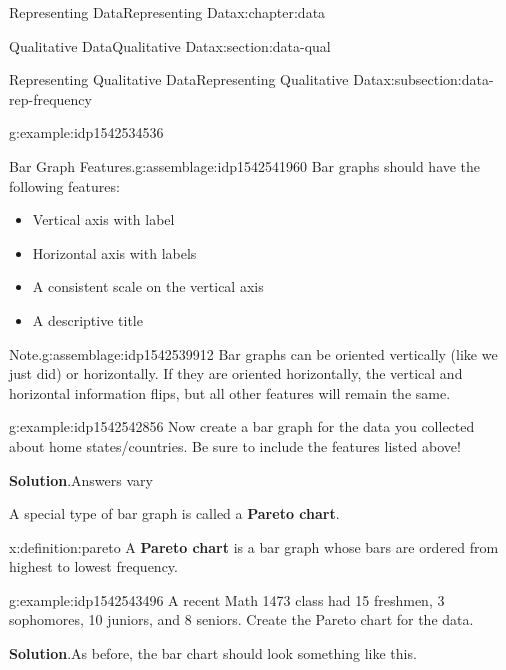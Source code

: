\documentclass[oneside,10pt,]{book}
\newcommand{\blocktitlefont}{\relax}
\newcommand{\terminology}[1]{\textbf{#1}}
\begin{document}
\begin{chapterptx}{Representing Data}{}{Representing Data}{}{}{x:chapter:data}
\begin{sectionptx}{Qualitative Data}{}{Qualitative Data}{}{}{x:section:data-qual}
\begin{subsectionptx}{Representing Qualitative Data}{}{Representing Qualitative Data}{}{}{x:subsection:data-rep-frequency}
\begin{example}{}{g:example:idp1542534536}
%
\end{example}
\begin{assemblage}{Bar Graph Features.}{g:assemblage:idp1542541960}%
Bar graphs should have the following features:%
\par
%
\begin{itemize}[label=\textbullet]
\item{}Vertical axis with label%
\item{}Horizontal axis with labels%
\item{}A consistent scale on the vertical axis%
\item{}A descriptive title%
\end{itemize}
%
\end{assemblage}
\begin{assemblage}{Note.}{g:assemblage:idp1542539912}%
Bar graphs can be oriented vertically (like we just did) or horizontally.  If they are oriented horizontally, the vertical and horizontal information flips, but all other features will remain the same.%
\end{assemblage}
\begin{example}{}{g:example:idp1542542856}%
Now create a bar graph for the data you collected about home states\slash{}countries.  Be sure to include the features listed above!%
\par\smallskip%
\noindent\textbf{\blocktitlefont Solution}.\hypertarget{g:solution:idp1542547336}{}\quad{}Answers vary%
\end{example}
A special type of bar graph is called a \terminology{Pareto chart}.%
\begin{definition}{}{x:definition:pareto}%
A \terminology{Pareto chart} is a bar graph whose bars are ordered from highest to lowest frequency.%
%
\end{definition}
\begin{example}{}{g:example:idp1542543496}%
A recent Math 1473 class had 15 freshmen, 3 sophomores, 10 juniors, and 8 seniors.  Create the Pareto chart for the data.%
\par\smallskip%
\noindent\textbf{\blocktitlefont Solution}.\hypertarget{g:solution:idp1542555528}{}\quad{}As before, the bar chart should look something like this.%
\par
\begin{image}{0}{1}{0}%
\resizebox{\linewidth}{!}{%
\begin{tikzpicture}
    \begin{axis}[
            title = Class Makeup,
            ybar,
            nodes near coords,

\end{axis}
\end{tikzpicture}}
\end{image}
\end{example}
\end{subsectionptx}
\end{sectionptx}
\end{chapterptx}
\end{document}
